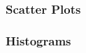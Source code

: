 \subsubsection{Scatter Plots}

\subsubsection{Histograms}





\begin{comment}

- Maybe rename file to Rand_Statistics.tex

-descriptive vs inductive statistics
 descriptive: describes data that is available
 inductive: draws conclusions from sampled data about a general population



The 7 Levels of Statistics
https://www.youtube.com/watch?v=eg6N0i8NVxs

\end{comment}
